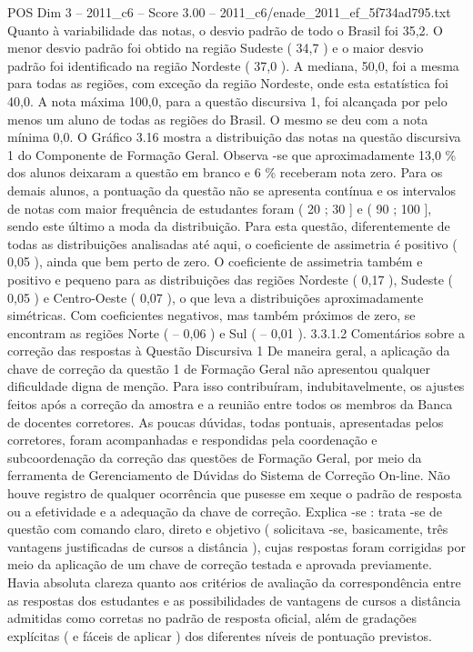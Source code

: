 \begin{textsample}{POS Dim 3 – 2011\_c6 – Score 3.00 – 2011\_c6/enade\_2011\_ef\_5f734ad795.txt}
Quanto à variabilidade das notas, o desvio padrão de todo o Brasil foi 35,2.
O menor desvio padrão foi obtido na região Sudeste ( 34,7 ) e o maior desvio padrão foi identificado na região Nordeste ( 37,0 ).
A mediana, 50,0, foi a mesma para todas as regiões, com exceção da região Nordeste, onde esta estatística foi 40,0.
A nota máxima 100,0, para a questão discursiva 1, foi alcançada por pelo menos um aluno de todas as regiões do Brasil.
O mesmo se deu com a nota mínima 0,0.
O Gráfico 3.16 mostra a distribuição das notas na questão discursiva 1 do Componente de Formação Geral.
Observa -se que aproximadamente 13,0 \% dos alunos deixaram a questão em branco e 6 \% receberam nota zero.
Para os demais alunos, a pontuação da questão não se apresenta contínua e os intervalos de notas com maior frequência de estudantes foram ( 20 ; 30 ] e ( 90 ; 100 ], sendo este último a moda da distribuição.
Para esta questão, diferentemente de todas as distribuições analisadas até aqui, o coeficiente de assimetria é positivo ( 0,05 ), ainda que bem perto de zero.
O coeficiente de assimetria também e positivo e pequeno para as distribuições das regiões Nordeste ( 0,17 ), Sudeste ( 0,05 ) e Centro-Oeste ( 0,07 ), o que leva a distribuições aproximadamente simétricas.
Com coeficientes negativos, mas também próximos de zero, se encontram as regiões Norte ( – 0,06 ) e Sul ( – 0,01 ). 3.3.1.2 Comentários sobre a correção das respostas à Questão Discursiva 1 De maneira geral, a aplicação da chave de correção da questão 1 de Formação Geral não apresentou qualquer dificuldade digna de menção.
Para isso contribuíram, indubitavelmente, os ajustes feitos após a correção da amostra e a reunião entre todos os membros da Banca de docentes corretores.
As poucas dúvidas, todas pontuais, apresentadas pelos corretores, foram acompanhadas e respondidas pela coordenação e subcoordenação da correção das questões de Formação Geral, por meio da ferramenta de Gerenciamento de Dúvidas do Sistema de Correção On-line.
Não houve registro de qualquer ocorrência que pusesse em xeque o padrão de resposta ou a efetividade e a adequação da chave de correção.
Explica -se : trata -se de questão com comando claro, direto e objetivo ( solicitava -se, basicamente, três vantagens justificadas de cursos a distância ), cujas respostas foram corrigidas por meio da aplicação de um chave de correção testada e aprovada previamente.
Havia absoluta clareza quanto aos critérios de avaliação da correspondência entre as respostas dos estudantes e as possibilidades de vantagens de cursos a distância admitidas como corretas no padrão de resposta oficial, além de gradações explícitas ( e fáceis de aplicar ) dos diferentes níveis de pontuação previstos.

\end{textsample}
